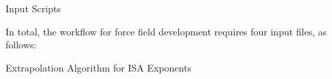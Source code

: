 \begin{subappendices}
\begin{section}{Input Scripts}

In total, the workflow for force field development requires four input files,
as follows:

\scriptsize

\normalsize

\scriptsize

\normalsize

\scriptsize

\normalsize

\scriptsize

\normalsize

\end{section}
\begin{section}{Extrapolation Algorithm for ISA Exponents}
\label{sec:workflow-exponent_algorithm}

\end{section}
\end{subappendices}
